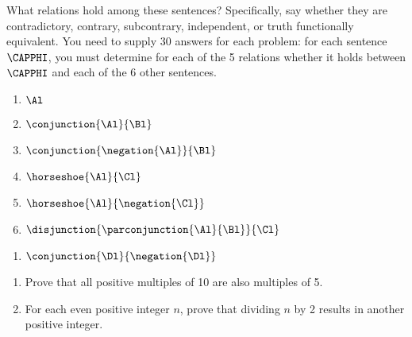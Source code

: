 
What relations hold among these sentences? Specifically, say whether they are contradictory, contrary, subcontrary, independent, or truth functionally equivalent. You need to supply 30 answers for each problem: for each sentence $\CAPPHI$, you must determine for each of the 5 relations whether it holds between $\CAPPHI$ and each of the 6 other sentences.
\begin{multicols}{2}
\begin{enumerate}
\item {$\Al$}
\item {$\conjunction{\Al}{\Bl}$}
\item {$\conjunction{\negation{\Al}}{\Bl}$}
\item {$\horseshoe{\Al}{\Cl}$}
\item {$\horseshoe{\Al}{\negation{\Cl}}$}
\item {$\disjunction{\parconjunction{\Al}{\Bl}}{\Cl}$}
\end{enumerate}
\end{multicols}
\begin{enumerate}[start=7]
\item {$\conjunction{\Dl}{\negation{\Dl}}$}
\end{enumerate}



\begin{enumerate}
	\item Prove that all positive multiples of 10 are also multiples of 5.
	\item For each even positive integer $n$, prove that dividing $n$ by 2 results in another positive integer.
\end{enumerate}


